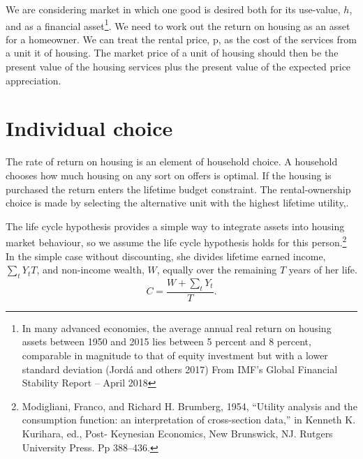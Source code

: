\documentclass[11pt]{amsart}
\begin{document}
We are considering market in which one good is desired  both for its use-value, $h$, and as a financial asset\footnote{ In many advanced economies, the average annual real return on housing assets between 1950 and 2015 lies between 5 percent and 8 percent, comparable in magnitude to that of equity investment but with a lower standard deviation (Jord\'a and others 2017) From IMF’s Global Financial Stability Report – April 2018}.   We need to work out the return on housing as an asset for a homeowner. We can treat the rental price, p, as the cost of the services from a unit it of housing. The market price of a unit of housing  should then be the present value of the housing services plus the present value of the expected price appreciation. 
\section{Individual choice}

The rate of return on housing is an element of household choice. A household chooses how much housing on any sort on offers is optimal. If the housing is purchased the return enters the lifetime budget constraint. The rental-ownership choice is made by selecting the alternative unit with the highest lifetime utility,. 

The life cycle hypothesis provides a simple way to integrate assets into housing market behaviour, so we assume the life cycle hypothesis holds for this person.\footnote{Modigliani, Franco, and Richard H. Brumberg, 1954, “Utility analysis and the consumption function: an interpretation of cross-section data,” in Kenneth K. Kurihara, ed., Post- Keynesian Economics, New Brunswick, NJ. Rutgers University Press. Pp 388–436.} In the simple case without discounting, she divides lifetime earned income, $\sum_t{Y_t}{T}$, and non-income wealth, $W$, equally over the remaining $T$ years of her life.  
    \[C = \frac{W+\sum_tY_t}{T}.\]
\end{document}
